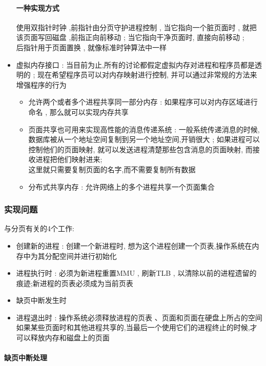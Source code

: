 \documentclass[UTF8,a4paper]{ctexart}
\begin{document}
\begin{itemize}
	\paragraph{一种实现方式} 使用双指针时钟 ,前指针由分页守护进程控制 ,  当它指向一个脏页面时 , 就把该页面写回磁盘 ,前指正向前移动 ; 当它指向干净页面时, 直接向前移动 ;\\
	后指针用于页面置换 , 就像标准时钟算法中一样	
	\item 虚拟内存接口 : 当目前为止,所有的讨论都假定虚拟内存对进程和程序员都是透明的 ; 现在希望程序员可以对内存映射进行控制, 并可以通过非常规的方法来增强程序的行为
	\begin{itemize}
		\item 允许两个或者多个进程共享同一部分内存 : 如果程序可以对内存区域进行命名 , 那么就可以实现内存共享
		\item 页面共享也可用来实现高性能的消息传递系统 : 一般系统传递消息的时候,数据库被从一个地址空间复制到另一个地址空间,开销很大 ; 如果进程可以控制他们的页面映射, 就可以发送进程清楚那些包含消息的页面映射, 而接收进程把他们映射进来;\\
		这里就只需要复制页面的名字,而不需要复制所有数据
		\item 分布式共享内存 : 允许网络上的多个进程共享一个页面集合 
	\end{itemize}
\end{itemize}

\subsubsection{实现问题}
与分页有关的4个工作:
\begin{itemize}
	\item 创建新的进程 : 创建一个新进程时, 想为这个进程创建一个页表,操作系统在内存中为其分配空间并进行初始化
	\item 进程执行时 : 必须为新进程重置MMU , 刷新TLB , 以清除以前的进程遗留的痕迹;新进程的页表必须成为当前页表
	\item 缺页中断发生时 
	\item 进程退出时 : 操作系统必须释放进程的页表 、页面和页面在硬盘上所占的空间\\如果某些页面时和其他进程共享的,当最后一个使用它们的进程终止的时候,才可以释放内存和磁盘上的页面
\end{itemize}

\paragraph{缺页中断处理}
\end{document}

